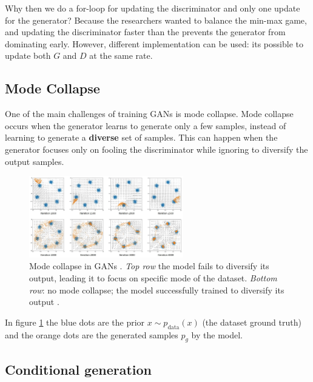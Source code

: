 Why then we do a for-loop for updating the discriminator and only one update for the generator? Because the researchers wanted to balance the min-max game, and updating the discriminator faster than the prevents the generator from dominating early. However, different implementation can be used: its possible to update both $G$ and $D$ at the same rate.








\subsection{Mode Collapse}
\label{gan_mode_collapse}

One of the main challenges of training GANs is mode collapse. Mode collapse occurs when the generator learns to generate only a few samples, instead of learning to generate a \textbf{diverse} set of samples. This can happen when the generator focuses only on fooling the discriminator while ignoring to diversify the output samples.

\begin{figure}
    \centering
    \includegraphics[width=0.6\textwidth]{images/gan/gan_mode_collapse.png}
    \caption{Mode collapse in GANs \cite{gan_mode_collapse_image_source}. \textit{Top row} the model fails to diversify its output, leading it to focus on specific mode of the dataset. \textit{Bottom row}: no mode collapse; the model successfully trained to diversify its output \cite{gan_mode_collapse_image_source}.}
    \label{fig:gan_mode_collapse}
\end{figure}

In figure \ref{fig:gan_mode_collapse} the blue dots are the prior $x \sim p_{\text{data}}(x)$ (the dataset ground truth) and the orange dots are the generated samples $p_g$ by the model.




\subsection{Conditional generation}
\label{subsec:gan_conditional_generation}


